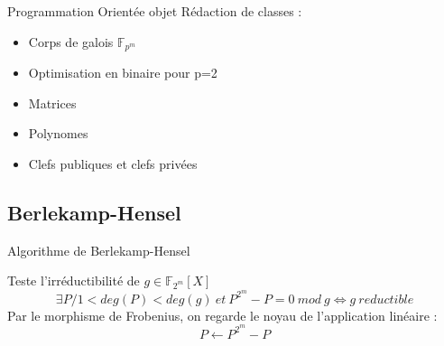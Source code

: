 \documentclass{beamer}
\begin{document}
			\begin{frame}{Programmation Orientée objet}
				Rédaction de classes :
				\begin{itemize}
					\item Corps de galois $\mathbb{F}_{p^{m}}$
					\item Optimisation en binaire pour p=2
					\item Matrices
					\item Polynomes
					\item Clefs publiques et clefs privées
				\end{itemize}
			\end{frame}

		\subsection{Berlekamp-Hensel}

			\begin{frame}{Algorithme de Berlekamp-Hensel}

				Teste l'irréductibilité de $ g \in \mathbb{F}_{2^{m}}[X] $
				$$
					\exists P / 1<deg(P)<deg(g) \ et \ P^{2^{m}} - P = 0 \ mod \ g \Leftrightarrow g \ reductible
				$$
				Par le morphisme de Frobenius, on regarde le noyau de l'application linéaire :
				$$
					P \leftarrow P^{2^{m}} - P
				$$
				
			\end{frame}
		
	    
\end{document}
